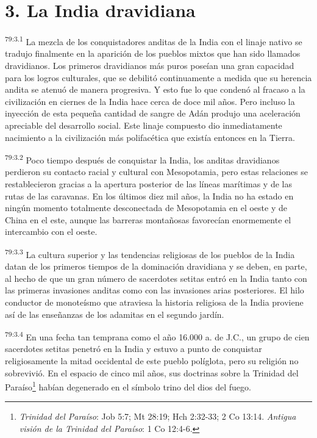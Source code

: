 \section*{3. La India dravidiana}
\par
\textsuperscript{79:3.1} La mezcla de los conquistadores anditas de la India con el linaje nativo se tradujo finalmente en la aparición de los pueblos mixtos que han sido llamados dravidianos. Los primeros dravidianos más puros poseían una gran capacidad para los logros culturales, que se debilitó continuamente a medida que su herencia andita se atenuó de manera progresiva. Y esto fue lo que condenó al fracaso a la civilización en ciernes de la India hace cerca de doce mil años. Pero incluso la inyección de esta pequeña cantidad de sangre de Adán produjo una aceleración apreciable del desarrollo social. Este linaje compuesto dio inmediatamente nacimiento a la civilización más polifacética que existía entonces en la Tierra.

\par
\textsuperscript{79:3.2} Poco tiempo después de conquistar la India, los anditas dravidianos perdieron su contacto racial y cultural con Mesopotamia, pero estas relaciones se restablecieron gracias a la apertura posterior de las líneas marítimas y de las rutas de las caravanas. En los últimos diez mil años, la India no ha estado en ningún momento totalmente desconectada de Mesopotamia en el oeste y de China en el este, aunque las barreras montañosas favorecían enormemente el intercambio con el oeste.

\par
\textsuperscript{79:3.3} La cultura superior y las tendencias religiosas de los pueblos de la India datan de los primeros tiempos de la dominación dravidiana y se deben, en parte, al hecho de que un gran número de sacerdotes setitas entró en la India tanto con las primeras invasiones anditas como con las invasiones arias posteriores. El hilo conductor de monoteísmo que atraviesa la historia religiosa de la India proviene así de las enseñanzas de los adamitas en el segundo jardín.

\par
\textsuperscript{79:3.4} En una fecha tan temprana como el año 16.000 a. de J.C., un grupo de cien sacerdotes setitas penetró en la India y estuvo a punto de conquistar religiosamente la mitad occidental de este pueblo políglota, pero su religión no sobrevivió. En el espacio de cinco mil años, sus doctrinas sobre la Trinidad del Paraíso\footnote{\textit{Trinidad del Paraíso}: Job 5:7; Mt 28:19; Hch 2:32-33; 2 Co 13:14. \textit{Antigua visión de la Trinidad del Paraíso}: 1 Co 12:4-6.} habían degenerado en el símbolo trino del dios del fuego.

